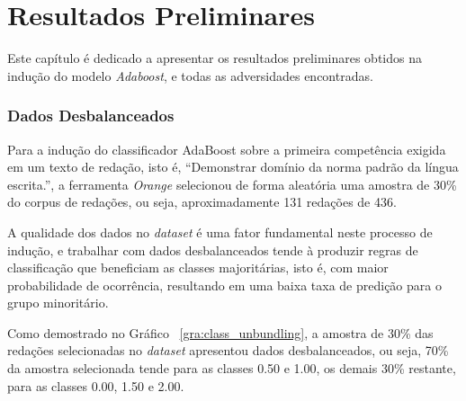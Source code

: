 \chapter{Resultados Preliminares}\label{result}

Este capítulo é dedicado a apresentar os resultados preliminares obtidos na indução do modelo \textit{Adaboost}, e todas as adversidades encontradas.

\subsection{Dados Desbalanceados}

Para a indução do classificador AdaBoost sobre a primeira competência exigida em um texto de redação, isto é,  ``Demonstrar domínio da norma padrão da língua escrita.'', a ferramenta \textit{Orange} selecionou de forma aleatória uma amostra de 30\% do corpus de redações, ou seja, aproximadamente 131 redações de 436. 

A qualidade dos dados no \textit{dataset} é uma fator fundamental neste processo de indução, e trabalhar com dados desbalanceados tende à produzir regras de classificação que beneficiam as classes majoritárias, isto é, com maior probabilidade de ocorrência, resultando em uma baixa taxa de predição para o grupo minoritário.

Como demostrado no Gráfico ~\ref{gra:class_unbundling}, a amostra de 30\% das redações selecionadas no \textit{dataset} apresentou dados desbalanceados, ou seja, 70\% da amostra selecionada tende para as classes 0.50 e 1.00, os demais 30\% restante, para as classes 0.00, 1.50 e 2.00. 

\mydata

